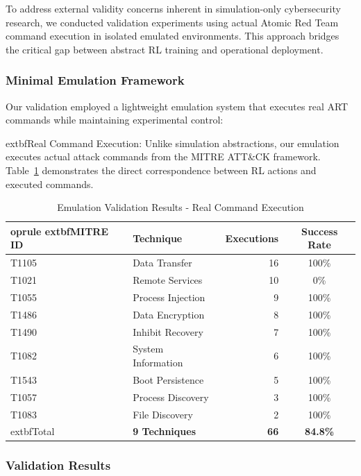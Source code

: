 \documentclass[12pt,oneside]{article}
\begin{document}
To address external validity concerns inherent in simulation-only cybersecurity research, we conducted validation experiments using actual Atomic Red Team command execution in isolated emulated environments. This approach bridges the critical gap between abstract RL training and operational deployment.

\subsubsection{Minimal Emulation Framework}

Our validation employed a lightweight emulation system that executes real ART commands while maintaining experimental control:

	extbf{Real Command Execution}: Unlike simulation abstractions, our emulation executes actual attack commands from the MITRE ATT\&CK framework. Table~\ref{tab:emulation_validation} demonstrates the direct correspondence between RL actions and executed commands.

\begin{table}[H]
\centering
\caption{Emulation Validation Results - Real Command Execution}
\label{tab:emulation_validation}
\begin{tabular}{llrc}
	oprule
	extbf{MITRE ID} & \textbf{Technique} & \textbf{Executions} & \textbf{Success Rate} \\
\midrule
T1105 & Data Transfer & 16 & 100\% \\
T1021 & Remote Services & 10 & 0\% \\
T1055 & Process Injection & 9 & 100\% \\
T1486 & Data Encryption & 8 & 100\% \\
T1490 & Inhibit Recovery & 7 & 100\% \\
T1082 & System Information & 6 & 100\% \\
T1543 & Boot Persistence & 5 & 100\% \\
T1057 & Process Discovery & 3 & 100\% \\
T1083 & File Discovery & 2 & 100\% \\
\midrule
	extbf{Total} & \textbf{9 Techniques} & \textbf{66} & \textbf{84.8\%} \\
\bottomrule
\end{tabular}
\end{table}

\subsubsection{Validation Results}
\end{document}
